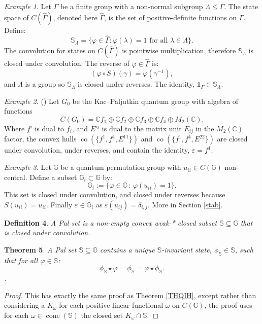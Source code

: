\documentclass[12pt]{amsart}
\newtheorem{theorem}{Theorem}[section]
\newtheorem{definition}[theorem]{Definition}
\theoremstyle{remark}
\newtheorem{example}[theorem]{Example}
\theoremstyle{remark}
\begin{document}
\begin{example}
Let $\Gamma$ be a finite group with a non-normal subgroup $\Lambda\leq \Gamma$. The state space of $C(\widehat{\Gamma})$, denoted here $\widehat{\Gamma}$, is the set of positive-definite functions on $\Gamma$. Define:
\begin{equation}\mathbb{S}_{\Lambda}=\{\varphi\in\widehat{\Gamma}:\varphi(\lambda)=1\text{ for all }\lambda\in \Lambda\}.\label{SLAM}\end{equation}
The convolution for states on $C(\widehat{\Gamma})$ is pointwise multiplication, therefore $\mathbb{S}_{\Lambda}$ is closed under convolution. The reverse of $\varphi\in \widehat{\Gamma}$ is:
$$(\varphi\circ S)(\gamma)=\varphi(\gamma^{-1}),$$
and $\Lambda$ is a group so $\mathbb{S}_{\Lambda}$ is closed under reverses. The identity, $\mathds{1}_{\Gamma}\in \mathbb{S}_{\Lambda}$.
\end{example}
\begin{example}\label{KacP}(\cite{mcc})
Let $G_0$ be the Kac--Paljutkin quantum group with algebra of functions
$$C(G_0)=\mathbb{C}f_1\oplus \mathbb{C}f_2\oplus\mathbb{C}f_3\oplus\mathbb{C}f_4\oplus M_2(\mathbb{C}).$$
Where $f^i$ is dual to  $f_i$, and $E^{ij}$ is dual to the matrix unit $E_{ij}$ in the $M_2(\mathbb{C})$ factor, the convex hulls $\operatorname{co}(\{f^1,f^4,E^{11}\})$ and $\operatorname{co}(\{f^1,f^4,E^{22}\})$ are closed under convolution, under reverses, and contain the identity, $\varepsilon=f^1$.
\end{example}
\begin{example}
Let $\mathbb{G}$ be a  quantum permutation group with $u_{ii}\in C(\mathbb{G})$ non-central. Define a subset $\mathbb{G}_i\subset \mathbb{G}$ by:
$$\mathbb{G}_i:=\{\varphi\in \mathbb{G}\,:\,\varphi(u_{ii})=1\}.$$
This set is closed under convolution, and closed under reverses because $S(u_{ii})=u_{ii}$. Finally $\varepsilon\in\mathbb{G}_i$ as $\varepsilon(u_{ij})=\delta_{i,j}$. More in Section  \ref{stab}.
\end{example}
\begin{definition}\label{Pal}
 A \emph{Pal set} is a non-empty convex weak-* closed subset $\mathbb{S}\subseteq \mathbb{G}$ that is closed under convolution.
\end{definition}


\begin{theorem}\label{THQI}
A Pal set $\mathbb{S}\subseteq\mathbb{G}$ contains a unique $\mathbb{S}$-invariant state, $\phi_{\mathbb{S}}\in\mathbb{S}$, such that for all $\varphi\in\mathbb{S}$:
$$\phi_{\mathbb{S}}\star \varphi=\phi_{\mathbb{S}}=\varphi\star\phi_{\mathbb{S}}.$$.
\end{theorem}
\begin{proof}
This has exactly the same proof as Theorem \ref{THQIH}, except rather than considering a $K_\omega$ for each positive linear functional $\omega$ on $C(\mathbb{G})$, the proof uses for each $\omega\in\operatorname{cone}(\mathbb{S})$ the closed set $K_\omega\cap \mathbb{S}$.
\end{proof}
\end{document}
